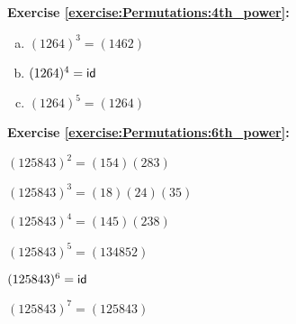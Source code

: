 \noindent\textbf{Exercise \ref{exercise:Permutations:4th_power}:}
\begin{multicols}{3}
\begin{enumerate}[(a)]
\item
$(1 2 6 4)^3 = (1462)$

\item
$(1 2 6 4)^4 = \sf{id}$

\item
$(1 2 6 4)^5 = (1 2 6 4)$
\end{enumerate}
\end{multicols}

\noindent\textbf{Exercise \ref{exercise:Permutations:6th_power}:}
\begin{enumerate}[{a.}]
\begin{multicols}{2}
\item
$(125843)^2 = (154)(283)$

\item
$(125843)^3 = (18)(24)(35)$

\item
$(125843)^4 = (145)(238)$

\item
$(125843)^5 = (134852)$

\item
$(125843)^6 = \sf{id}$

\item
$(125843)^7 = (125843)$
\end{multicols}
\end{enumerate}

